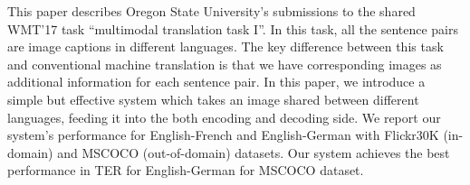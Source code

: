 This paper describes Oregon State University's submissions to the shared WMT'17 task ``multimodal translation task I''. In this task, all the sentence pairs are image captions in different languages. The key difference between this task and conventional machine translation is that we have corresponding images as additional information for each sentence pair. In this paper, we introduce a simple but effective system which takes an image shared between different languages, feeding it into the both encoding and decoding side. We report our system's performance for English-French and English-German with Flickr30K (in-domain) and MSCOCO (out-of-domain) datasets. Our system achieves the best performance in TER for English-German for MSCOCO dataset.
